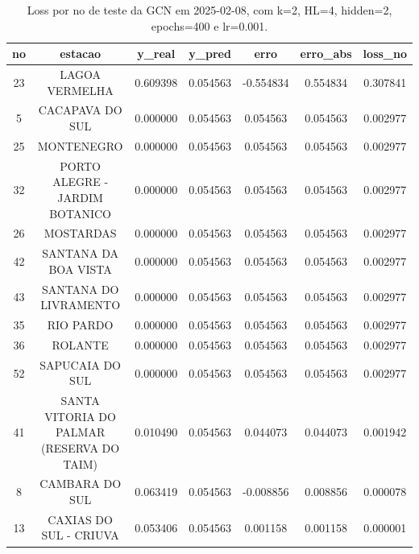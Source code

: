 \begin{table}[h]
\centering
\caption{Loss por no de teste da GCN em 2025-02-08, com k=2, HL=4, hidden=2, epochs=400 e lr=0.001.}
\label{tab:gcn_loss_k2_hl4_h2_e400_d20250208}
\begin{tabular}{ccccccc}
\toprule
no & estacao & y\_real & y\_pred & erro & erro\_abs & loss\_no \\
\midrule
23 & LAGOA VERMELHA & 0.609398 & 0.054563 & -0.554834 & 0.554834 & 0.307841 \\
5 & CACAPAVA DO SUL & 0.000000 & 0.054563 & 0.054563 & 0.054563 & 0.002977 \\
25 & MONTENEGRO & 0.000000 & 0.054563 & 0.054563 & 0.054563 & 0.002977 \\
32 & PORTO ALEGRE - JARDIM BOTANICO & 0.000000 & 0.054563 & 0.054563 & 0.054563 & 0.002977 \\
26 & MOSTARDAS & 0.000000 & 0.054563 & 0.054563 & 0.054563 & 0.002977 \\
42 & SANTANA DA BOA VISTA & 0.000000 & 0.054563 & 0.054563 & 0.054563 & 0.002977 \\
43 & SANTANA DO LIVRAMENTO & 0.000000 & 0.054563 & 0.054563 & 0.054563 & 0.002977 \\
35 & RIO PARDO & 0.000000 & 0.054563 & 0.054563 & 0.054563 & 0.002977 \\
36 & ROLANTE & 0.000000 & 0.054563 & 0.054563 & 0.054563 & 0.002977 \\
52 & SAPUCAIA DO SUL & 0.000000 & 0.054563 & 0.054563 & 0.054563 & 0.002977 \\
41 & SANTA VITORIA DO PALMAR (RESERVA DO TAIM) & 0.010490 & 0.054563 & 0.044073 & 0.044073 & 0.001942 \\
8 & CAMBARA DO SUL & 0.063419 & 0.054563 & -0.008856 & 0.008856 & 0.000078 \\
13 & CAXIAS DO SUL - CRIUVA & 0.053406 & 0.054563 & 0.001158 & 0.001158 & 0.000001 \\
\bottomrule
\end{tabular}
\end{table}
